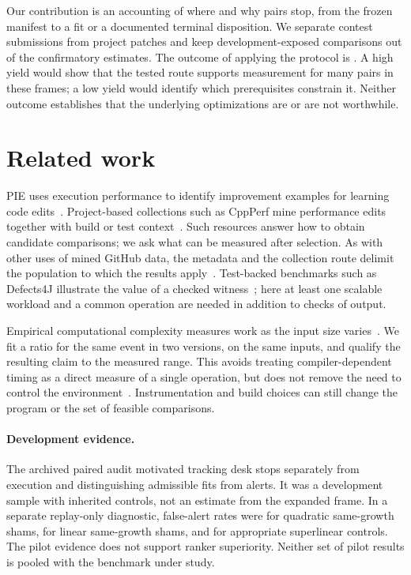 \documentclass[11pt]{article}
\begin{document}
Our contribution is an accounting of where and why pairs stop, from the
frozen manifest to a fit or a documented terminal disposition. We separate
contest submissions from project patches and keep development-exposed
comparisons out of the confirmatory estimates. The outcome of applying the
protocol is \BenchIntroTakeaway. A high yield would show that the tested
route supports measurement for many pairs in these frames; a low yield
would identify which prerequisites constrain it. Neither outcome establishes
that the underlying optimizations are or are not worthwhile.

\section{Related work}

PIE uses execution performance to identify improvement examples for learning
code edits~\cite{shypula2024pie}. Project-based collections such as
CppPerf mine performance edits together with build or test
context~\cite{ho2026cppperf}. Such resources answer how to obtain candidate
comparisons; we ask what can be measured after selection. As with other uses
of mined GitHub data, the metadata and the collection route delimit the
population to which the results apply~\cite{kalliamvakou2014promises}.
Test-backed benchmarks such as Defects4J illustrate the value of a checked
witness~\cite{just2014defects4j}; here at least one scalable workload and a
common operation are needed in addition to checks of output.

Empirical computational complexity measures work as the input size
varies~\cite{goldsmith2007measuring}. We fit a ratio for the same event in
two versions, on the same inputs, and qualify the resulting claim to the
measured range. This avoids treating compiler-dependent timing as a direct
measure of a single operation, but does not remove the need to control the
environment~\cite{mytkowicz2009producing}. Instrumentation and build choices
can still change the program or the set of feasible comparisons.

\paragraph{Development evidence.}
The archived paired audit motivated tracking desk stops separately from
execution and distinguishing admissible fits from alerts. It was a
development sample with inherited controls, not an estimate from the
expanded frame. In a separate replay-only diagnostic, false-alert rates
were \GroupedQuadraticFalse{} for quadratic same-growth shams,
\GroupedLinearFalse{} for linear same-growth shams, and
\GroupedAppropriateFalse{} for appropriate superlinear controls.
The pilot evidence does not support ranker superiority. Neither set of
pilot results is pooled with the benchmark under study.
\end{document}
